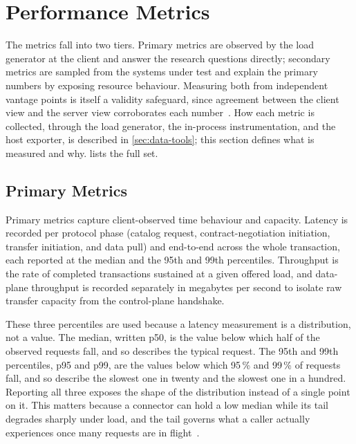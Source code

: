 \section{Performance Metrics}\label{sec:metrics}

The metrics fall into two tiers. Primary metrics are observed by the load generator at the client and answer the research questions directly; secondary metrics are sampled from the systems under test and explain the primary numbers by exposing resource behaviour. Measuring both from independent vantage points is itself a validity safeguard, since agreement between the client view and the server view corroborates each number~\citep{hasselbring2021benchmarking}. How each metric is collected, through the load generator, the in-process instrumentation, and the host exporter, is described in \cref{sec:data-tools}; this section defines what is measured and why.  lists the full set.

\pagebreak

\subsection{Primary Metrics}\label{subsec:primary-metrics}

Primary metrics capture client-observed time behaviour and capacity. Latency is recorded per protocol phase (catalog request, contract-negotiation initiation, transfer initiation, and data pull) and end-to-end across the whole transaction, each reported at the median and the 95th and 99th percentiles. Throughput is the rate of completed transactions sustained at a given offered load, and data-plane throughput is recorded separately in megabytes per second to isolate raw transfer capacity from the control-plane handshake.

These three percentiles are used because a latency measurement is a distribution, not a value. The median, written p50, is the value below which half of the observed requests fall, and so describes the typical request. The 95th and 99th percentiles, p95 and p99, are the values below which 95\,\% and 99\,\% of requests fall, and so describe the slowest one in twenty and the slowest one in a hundred. Reporting all three exposes the shape of the distribution instead of a single point on it. This matters because a connector can hold a low median while its tail degrades sharply under load, and the tail governs what a caller actually experiences once many requests are in flight~\citep{dean2013tail}.

